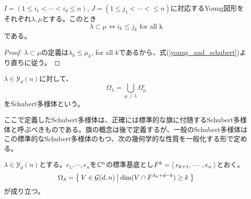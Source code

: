 \documentclass{ltjsreport}
\begin{document}
\begin{prop}
  $I=(1\leq i_1<\cdots<i_d\leq n)$, $J=(1\leq j_1<\cdots<\leq n)$に対応するYoung図形をそれぞれ$\lambda,\mu$とする。このとき
  \[
  \lambda\subset\mu\Leftrightarrow i_k\leq j_k\text{ for all k}  
  \]
  である。
\end{prop}

\begin{proof}
  $\lambda\subset\mu$の定義は$\lambda_k\leq\mu_k$, for all $k$であるから、式(\ref{young_and_schubert})より直ちに従う。
\end{proof}



\begin{defin}[標準的な旗に付随するShubert多様体]
  $\lambda\in\mathcal{Y}_d(n)$に対して、
  \[
  \Omega_\lambda=\bigcup_{\mu\supset\lambda}\Omega^\circ_\mu
  \]
  をSchubert多様体という。
\end{defin}

ここで定義したSchubert多様体は、正確には標準的な旗に付随するSchubert多様体と呼ぶべきものである。旗の概念は後で定義するが、一般のSchubert多様体はこの標準的なSchubert多様体のもつ、次の幾何学的な性質を一般化する形で定める。

\begin{prop}\label{schubert_var}
  $\lambda\in\mathcal{Y}_d(n)$とする。$e_1,\cdots,e_n$を$\mathbb{C}^n$の標準基底とし$F^k=\langle\:e_{k+1},\cdots,e_n\:\rangle$とおく。
  \[
  \Omega_{\lambda}=\left\{\:V\in\mathcal{G}(d,n)\:\middle|\:\dim(V\cap F^{\lambda_k+d-k})\geq k\:\right\}  
  \]
  が成り立つ。
\end{prop}
\end{document}
